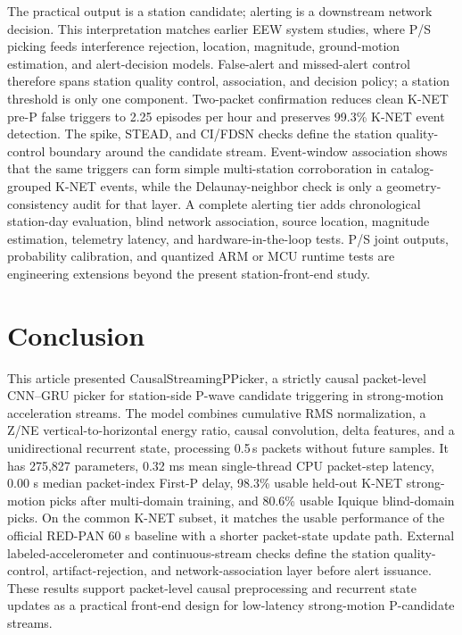 \documentclass[journal]{IEEEtran}
\newcommand{\modelv}{CausalStreamingPPicker\xspace}
\newcommand{\chunk}{0.5\,s\xspace}
\begin{document}
The practical output is a station candidate; alerting is a downstream network decision. This interpretation matches earlier EEW system studies, where P/S picking feeds interference rejection, location, magnitude, ground-motion estimation, and alert-decision models. False-alert and missed-alert control therefore spans station quality control, association, and decision policy; a station threshold is only one component. Two-packet confirmation reduces clean K-NET pre-P false triggers to 2.25 episodes per hour and preserves 99.3\% K-NET event detection. The spike, STEAD, and CI/FDSN checks define the station quality-control boundary around the candidate stream. Event-window association shows that the same triggers can form simple multi-station corroboration in catalog-grouped K-NET events, while the Delaunay-neighbor check is only a geometry-consistency audit for that layer. A complete alerting tier adds chronological station-day evaluation, blind network association, source location, magnitude estimation, telemetry latency, and hardware-in-the-loop tests. P/S joint outputs, probability calibration, and quantized ARM or MCU runtime tests are engineering extensions beyond the present station-front-end study.

\section{Conclusion}
This article presented \modelv, a strictly causal packet-level CNN--GRU picker for station-side P-wave candidate triggering in strong-motion acceleration streams. The model combines cumulative RMS normalization, a Z/NE vertical-to-horizontal energy ratio, causal convolution, delta features, and a unidirectional recurrent state, processing \chunk packets without future samples. It has 275,827 parameters, 0.32 ms mean single-thread CPU packet-step latency, 0.00 s median packet-index First-P delay, 98.3\% usable held-out K-NET strong-motion picks after multi-domain training, and 80.6\% usable Iquique blind-domain picks. On the common K-NET subset, it matches the usable performance of the official RED-PAN 60 s baseline with a shorter packet-state update path. External labeled-accelerometer and continuous-stream checks define the station quality-control, artifact-rejection, and network-association layer before alert issuance. These results support packet-level causal preprocessing and recurrent state updates as a practical front-end design for low-latency strong-motion P-candidate streams.
\end{document}
